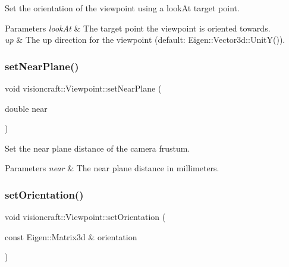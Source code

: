 Set the orientation of the viewpoint using a look\+At target point. 


\begin{DoxyParams}{Parameters}
{\em look\+At} & The target point the viewpoint is oriented towards. \\
\hline
{\em up} & The up direction for the viewpoint (default\+: Eigen\+::\+Vector3d\+::\+Unit\+Y()). \\
\hline
\end{DoxyParams}
\mbox{\label{classvisioncraft_1_1Viewpoint_adfb76d3eb8a11b69fd6368d20801f82e}} 
\subsubsection{\texorpdfstring{set\+Near\+Plane()}{setNearPlane()}}
{\footnotesize\ttfamily void visioncraft\+::\+Viewpoint\+::set\+Near\+Plane (\begin{DoxyParamCaption}\item[{double}]{near }\end{DoxyParamCaption})}



Set the near plane distance of the camera frustum. 


\begin{DoxyParams}{Parameters}
{\em near} & The near plane distance in millimeters. \\
\hline
\end{DoxyParams}
\mbox{\label{classvisioncraft_1_1Viewpoint_adbb30bbbe2e486d403b4fc616b42f58e}} 
\subsubsection{\texorpdfstring{set\+Orientation()}{setOrientation()}\hspace{0.1cm}{\footnotesize\ttfamily [1/2]}}
{\footnotesize\ttfamily void visioncraft\+::\+Viewpoint\+::set\+Orientation (\begin{DoxyParamCaption}\item[{const Eigen\+::\+Matrix3d \&}]{orientation }\end{DoxyParamCaption})}



